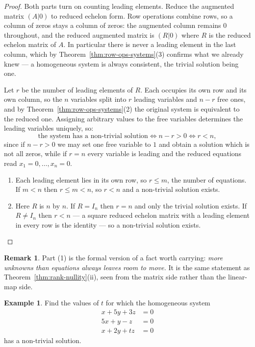 \documentclass[11pt,a4paper]{article}
\theoremstyle{definition}
\newtheorem{exa}[thm]{Example}
\newtheorem*{remark}{Remark}
\begin{document}
\begin{proof}
Both parts turn on counting leading elements. Reduce the augmented matrix
$(A|0)$ to reduced echelon form. Row operations combine rows, so a column of
zeros stays a column of zeros: the augmented column remains $0$ throughout, and
the reduced augmented matrix is $(R|0)$ where $R$ is the reduced echelon matrix
of $A$. In particular there is never a leading element in the last column,
which by Theorem~\ref{thm:row-ops-systems}(3) confirms what we already knew ---
a homogeneous system is always consistent, the trivial solution being one.

Let $r$ be the number of leading elements of $R$. Each occupies its own row and
its own column, so the $n$ variables split into $r$ leading variables and
$n-r$ free ones, and by
Theorem~\ref{thm:row-ops-systems}(2) the original system is equivalent to the
reduced one. Assigning arbitrary values to the free variables determines the
leading variables uniquely, so:
$$\text{the system has a non-trivial solution}\iff n-r>0 \iff r<n,$$
since if $n-r>0$ we may set one free variable to $1$ and obtain a solution
which is not all zeros, while if $r=n$ every variable is leading and the
reduced equations read $x_1=0,\dots,x_n=0$.

\begin{enumerate}
\item Each leading element lies in its own row, so $r\leq m$, the number of
equations. If $m<n$ then $r\leq m<n$, so $r<n$ and a non-trivial solution
exists.

\item Here $R$ is $n$ by $n$. If $R=I_n$ then $r=n$ and only the trivial
solution exists. If $R\neq I_n$ then $r<n$ --- a square reduced echelon matrix
with a leading element in every row is the identity --- so a non-trivial
solution exists.
\end{enumerate}
\end{proof}

\begin{remark}
Part (1) is the formal version of a fact worth carrying: \emph{more unknowns
than equations always leaves room to move.} It is the same statement as
Theorem~\ref{thm:rank-nullity}(ii), seen from the matrix side rather than the
linear-map side.
\end{remark}

\begin{exa}
Find the values of $t$ for which the homogeneous system
\begin{align*}
x+5y+3z &=0\\5x+y-z &=0\\x+2y+tz &=0
\end{align*}
has a non-trivial solution.
\end{exa}
\end{document}
